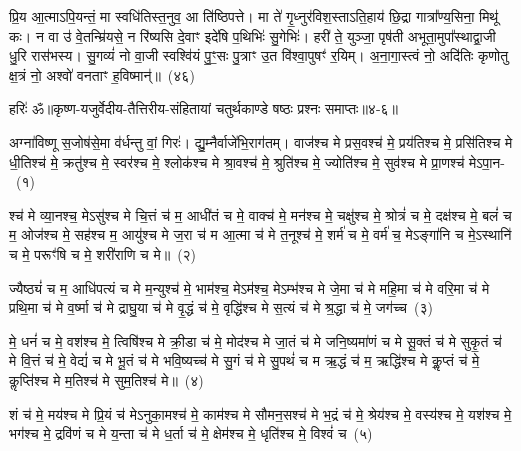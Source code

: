 प्रि॒य आ॒त्मा\-ऽ\-पि॒यन्तं॒ मा स्वधि॑तिस्त॒नुव॒ आ ति॑ष्ठिपत्ते। मा ते॑ गृ॒ध्नुर॑विश॒स्ताऽति॒हाय॑ छि॒द्रा गात्रा᳚ण्य॒सिना॒ मिथू॑ कः। न वा उ॑ वे॒तन्म्रि॑यसे॒ न रि॑ष्यसि दे॒वाꣳ इदे॑षि प॒थिभिः॑ सु॒गेभिः॑। हरी॑ ते॒ युञ्जा॒ पृष॑ती अभूता॒मुपा᳚स्थाद्वा॒जी धु॒रि रास॑भस्य। सु॒गव्यं॑ नो वा॒जी स्वश्वि॑यं पु॒ꣳ॒सः पु॒त्राꣳ उ॒त वि॑श्वा॒पुषꣳ॑ र॒यिम्। अ॒ना॒गा॒स्त्वं नो॒ अदि॑तिः कृणोतु क्ष॒त्रं नो॒ अश्वो॑ वनताꣳ ह॒विष्मान्॑॥~(४६)\ip


{\anuvakamend[{घा॒सिं कश॑या तपद्र॒यिं नव॑ च}]}

{हरिः॑ ॐ}{॥कृष्ण-यजुर्वेदीय-तैत्तिरीय-संहितायां चतुर्थकाण्डे षष्ठः प्रश्नः समाप्तः॥४-६॥}



\setcounter{anuvakam}{0}
अग्ना॑विष्णू स॒जोष॑से॒मा व॑र्धन्तु वां॒ गिरः॑। द्यु॒म्नैर्वाजे॑भि॒राग॑तम्। वाज॑श्च मे प्रस॒वश्च॑ मे॒ प्रय॑तिश्च मे॒ प्रसि॑तिश्च मे धी॒तिश्च॑ मे॒ क्रतु॑श्च मे॒ स्वर॑श्च मे॒ श्लोक॑श्च मे श्रा॒वश्च॑ मे॒ श्रुति॑श्च मे॒ ज्योति॑श्च मे॒ सुव॑श्च मे प्रा॒णश्च॑ मे\-ऽपा॒न-~(१)\ip

श्च॑ मे व्या॒नश्च॒ मे\-ऽसु॑श्च मे चि॒त्तं च॑ म॒ आधी॑तं च मे॒ वाक्च॑ मे॒ मन॑श्च मे॒ चक्षु॑श्च मे॒ श्रोत्रं॑ च मे॒ दक्ष॑श्च मे॒ बलं॑ च म॒ ओज॑श्च मे॒ सह॑श्च म॒ आयु॑श्च मे ज॒रा च॑ म आ॒त्मा च॑ मे त॒नूश्च॑ मे॒ शर्म॑ च मे॒ वर्म॑ च॒ मे\-ऽङ्गा॑नि च मे॒\-ऽस्थानि॑ च मे॒ परूꣳ॑षि च मे॒ शरी॑राणि च मे॥~(२)\ip

{\anuvakamend[{अ॒पा॒नस्त॒नूश्च॑ मे॒\-ऽष्टाद॑श च}]}

ज्यैष्ठ्यं॑ च म॒ आधि॑पत्यं च मे म॒न्युश्च॑ मे॒ भाम॑श्च॒ मे\-ऽम॑श्च॒ मे\-ऽम्भ॑श्च मे जे॒मा च॑ मे महि॒मा च॑ मे वरि॒मा च॑ मे प्रथि॒मा च॑ मे व॒र्ष्मा च॑ मे द्राघु॒या च॑ मे वृ॒द्धं च॑ मे॒ वृद्धि॑श्च मे स॒त्यं च॑ मे श्र॒द्धा च॑ मे॒ जग॑च्च~(३)\ip

मे॒ धनं॑ च मे॒ वश॑श्च मे॒ त्विषि॑श्च मे क्री॒डा च॑ मे॒ मोद॑श्च मे जा॒तं च॑ मे जनि॒ष्यमा॑णं च मे सू॒क्तं च॑ मे सुकृ॒तं च॑ मे वि॒त्तं च॑ मे॒ वेद्यं॑ च मे भू॒तं च॑ मे भवि॒ष्यच्च॑ मे सु॒गं च॑ मे सु॒पथं॑ च म ऋ॒द्धं च॑ म॒ ऋद्धि॑श्च मे कॢ॒प्तं च॑ मे॒ कॢप्ति॑श्च मे म॒तिश्च॑ मे सुम॒तिश्च॑ मे॥~(४)\ip

{\anuvakamend[{जग॒च्चर्द्धि॒श्चतु॑र्दश च}]}

शं च॑ मे॒ मय॑श्च मे प्रि॒यं च॑ मे\-ऽनुका॒मश्च॑ मे॒ काम॑श्च मे सौमन॒सश्च॑ मे भ॒द्रं च॑ मे॒ श्रेय॑श्च मे॒ वस्य॑श्च मे॒ यश॑श्च मे॒ भग॑श्च मे॒ द्रवि॑णं च मे य॒न्ता च॑ मे ध॒र्ता च॑ मे॒ क्षेम॑श्च मे॒ धृति॑श्च मे॒ विश्वं॑ च~(५)\ip


